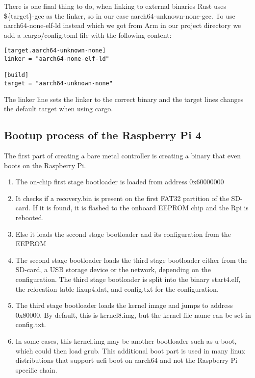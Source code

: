 There is one final thing to do, when linking to external binaries Rust uses \$\{target\}-gcc as the linker, so in our case aarch64-unknown-none-gcc.
To use aarch64-none-elf-ld instead which we got from Arm in our project directory we add a .cargo/config.toml file with the following content:
\begin{lstlisting}
[target.aarch64-unknown-none]
linker = "aarch64-none-elf-ld"

[build]
target = "aarch64-unknown-none"
\end{lstlisting}
The linker line sets the linker to the correct binary and the target lines changes the default target when using cargo.

\subsection{Bootup process of the Raspberry Pi 4}
\label{sec:concept_and_implementation:bare-metal:boot}

The first part of creating a bare metal controller is creating a binary that even boots on the Raspberry Pi.
\begin{enumerate}
    \item The on-chip first stage bootloader is loaded from address 0x60000000
    \item It checks if a recovery.bin is present on the first FAT32 partition of the SD-card. If it is found, it is flashed to the onboard EEPROM chip and the Rpi is rebooted.
    \item Else it loads the second stage bootloader and its configuration from the EEPROM
    \item The second stage bootloader loads the third stage bootloader either from the SD-card, a USB storage device or the network, depending on the configuration.
          The third stage bootloader is split into the binary start4.elf, the relocation table fixup4.dat, and config.txt for the configuration.
    \item The third stage bootloader loads the kernel image and jumps to address 0x80000. By default, this is kernel8.img, but the kernel file name can be set in config.txt.
    \item In some cases, this kernel.img may be another bootloader such as u-boot, which could then load grub.
          This additional boot part is used in many linux distributions that support uefi boot on aarch64 and not the Raspberry Pi specific chain.
\end{enumerate}

